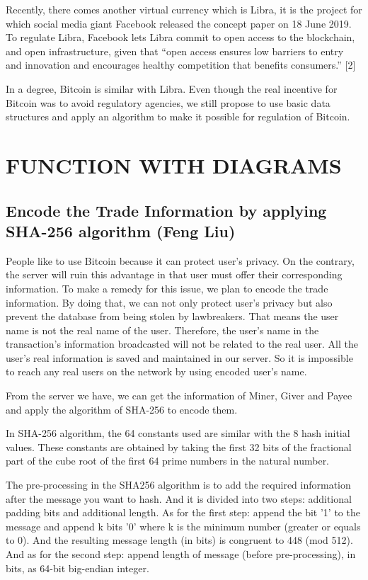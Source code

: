 \documentclass[conference]{IEEEtran}
\begin{document}
Recently, there comes another virtual currency which is Libra, it is the project for which social media giant Facebook released the concept paper on 18 June 2019. To regulate Libra, Facebook lets Libra commit to open access to the blockchain, and open infrastructure, given that “open access ensures low barriers to entry and innovation and encourages healthy competition that benefits consumers.” [2]

In a degree, Bitcoin is similar with Libra. Even though the real incentive for Bitcoin was to avoid regulatory agencies, we still propose to use basic data structures and apply an algorithm to make it possible for regulation of Bitcoin.

\section{FUNCTION WITH DIAGRAMS}
\subsection{Encode the Trade Information by applying SHA-256 algorithm (Feng Liu)}
People like to use Bitcoin because it can protect user’s privacy. On the contrary, the server will ruin this advantage in that user must offer their corresponding information. To make a remedy for this issue, we plan to encode the trade information. By doing that, we can not only protect user’s privacy but also prevent the database from being stolen by lawbreakers. That means the user name is not the real name of the user. Therefore, the user’s name in the transaction’s information broadcasted will not be related to the real user. All the user’s real information is saved and maintained in our server. So it is impossible to reach any real users on the network by using encoded user’s name.

From the server we have, we can get the information of Miner, Giver and Payee and apply the algorithm of SHA-256 to encode them.

In SHA-256 algorithm, the 64 constants used are similar with the 8 hash initial values. These constants are obtained by taking the first 32 bits of the fractional part of the cube root of the first 64 prime numbers in the natural number.

The pre-processing in the SHA256 algorithm is to add the required information after the message you want to hash. And it is divided into two steps: additional padding bits and additional length. As for the first step: append the bit '1' to the message and append k bits '0' where k is the minimum number (greater or equals to 0). And the resulting message length (in bits) is congruent to 448 (mod 512). And as for the second step: append length of message (before pre-processing), in bits, as 64-bit big-endian integer.
\end{document}
